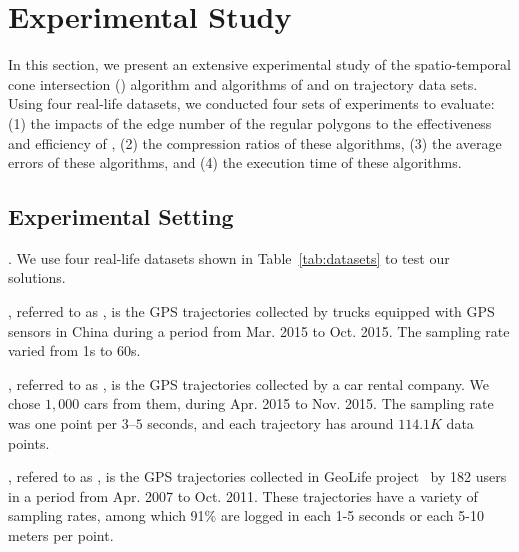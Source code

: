 \section{Experimental Study} %
\label{sec-exp}
In this section, we present an extensive experimental study of the spatio-temporal cone intersection (\cist) algorithm and algorithms of \dpa and \squishe on trajectory data sets.
Using four real-life datasets, we conducted four sets of experiments to evaluate:
(1) the impacts of the edge number of the regular polygons to the effectiveness and efficiency of \cist,
(2) the compression ratios of these algorithms,
(3) the average errors of these algorithms, and
(4) the execution time of these algorithms.



\subsection{Experimental Setting}

.
We use four real-life datasets shown in Table~\ref{tab:datasets} to test our solutions.

\eat{
}

, referred to as \truck, is the GPS trajectories collected by  trucks equipped with GPS sensors in China
during a period from Mar. 2015 to Oct. 2015. The sampling rate varied from 1s to 60s. 

, referred to as \sercar,  is the GPS trajectories collected by a car rental company.
We chose $1,000$ cars from them, during Apr. 2015 to Nov. 2015. The sampling rate was one point per $3$--$5$ seconds, and
each trajectory has around $114.1K$ data points.

, refered to as \geolife, is the GPS trajectories collected in GeoLife project~\cite{Zheng:GeoLife} by 182 users in a period from Apr. 2007 to Oct. 2011. These trajectories have a variety of sampling rates, among which 91\% are logged in each 1-5 seconds or each 5-10 meters per point. 

